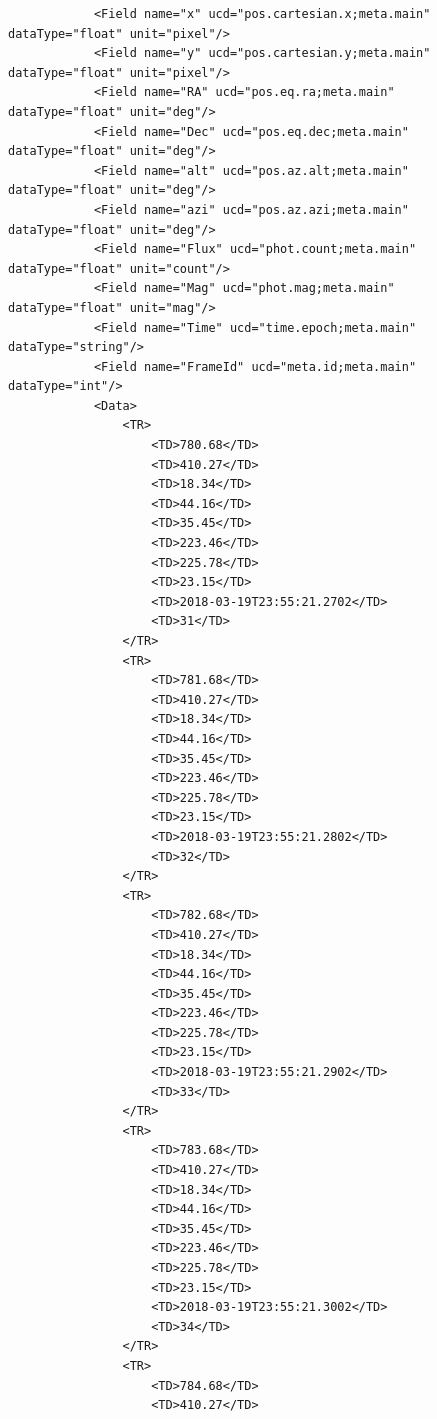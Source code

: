 \documentclass[referee,a4paper,12pt,traditabstract]{swsc}
\begin{document}
\begin{linenumbers}
{\begin{verbatim}
            <Field name="x" ucd="pos.cartesian.x;meta.main" dataType="float" unit="pixel"/>
            <Field name="y" ucd="pos.cartesian.y;meta.main" dataType="float" unit="pixel"/>
            <Field name="RA" ucd="pos.eq.ra;meta.main" dataType="float" unit="deg"/>
            <Field name="Dec" ucd="pos.eq.dec;meta.main" dataType="float" unit="deg"/>
            <Field name="alt" ucd="pos.az.alt;meta.main" dataType="float" unit="deg"/>
            <Field name="azi" ucd="pos.az.azi;meta.main" dataType="float" unit="deg"/>
            <Field name="Flux" ucd="phot.count;meta.main" dataType="float" unit="count"/>
            <Field name="Mag" ucd="phot.mag;meta.main" dataType="float" unit="mag"/>
            <Field name="Time" ucd="time.epoch;meta.main" dataType="string"/>
            <Field name="FrameId" ucd="meta.id;meta.main" dataType="int"/>
            <Data>
                <TR>
                    <TD>780.68</TD>
                    <TD>410.27</TD>
                    <TD>18.34</TD>
                    <TD>44.16</TD>
                    <TD>35.45</TD>
                    <TD>223.46</TD>
                    <TD>225.78</TD>
                    <TD>23.15</TD>
                    <TD>2018-03-19T23:55:21.2702</TD>
                    <TD>31</TD>
                </TR>
                <TR>
                    <TD>781.68</TD>
                    <TD>410.27</TD>
                    <TD>18.34</TD>
                    <TD>44.16</TD>
                    <TD>35.45</TD>
                    <TD>223.46</TD>
                    <TD>225.78</TD>
                    <TD>23.15</TD>
                    <TD>2018-03-19T23:55:21.2802</TD>
                    <TD>32</TD>
                </TR>
                <TR>
                    <TD>782.68</TD>
                    <TD>410.27</TD>
                    <TD>18.34</TD>
                    <TD>44.16</TD>
                    <TD>35.45</TD>
                    <TD>223.46</TD>
                    <TD>225.78</TD>
                    <TD>23.15</TD>
                    <TD>2018-03-19T23:55:21.2902</TD>
                    <TD>33</TD>
                </TR>
                <TR>
                    <TD>783.68</TD>
                    <TD>410.27</TD>
                    <TD>18.34</TD>
                    <TD>44.16</TD>
                    <TD>35.45</TD>
                    <TD>223.46</TD>
                    <TD>225.78</TD>
                    <TD>23.15</TD>
                    <TD>2018-03-19T23:55:21.3002</TD>
                    <TD>34</TD>
                </TR>
                <TR>
                    <TD>784.68</TD>
                    <TD>410.27</TD>

\end{verbatim}}
\end{linenumbers}
\end{document}
